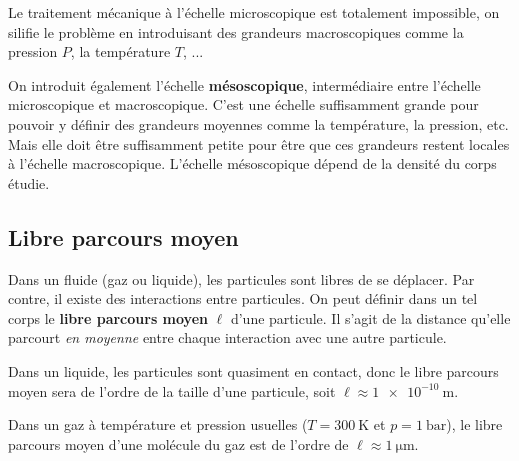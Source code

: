 \documentclass{cours}
\begin{document}
Le traitement mécanique à l'échelle microscopique est totalement impossible, on silifie le problème en introduisant des grandeurs macroscopiques comme la pression $P$, la température $T$, ...  

On introduit également l'échelle \textbf{mésoscopique}, intermédiaire entre l'échelle microscopique et macroscopique. C'est une échelle suffisamment grande pour pouvoir y définir des grandeurs moyennes comme la température, la pression, etc.  Mais elle doit être suffisamment petite pour être que ces grandeurs restent locales à l'échelle macroscopique. L'échelle mésoscopique dépend de la densité du corps étudie.

\subsection{Libre parcours moyen}%
\label{sub:libre_parcours_moyen}
Dans un fluide (gaz ou liquide), les particules sont libres de se déplacer. Par contre, il existe des interactions entre particules. On peut définir dans un tel corps le \textbf{libre parcours moyen} $\ell$  d'une particule. Il s'agit de la distance qu'elle parcourt \textit{en moyenne} entre chaque interaction avec une autre particule. 

Dans un liquide, les particules sont quasiment en contact, donc le libre parcours moyen sera de l'ordre de la taille d'une particule, soit $\ell \approx \SI{1e-10}{\meter}$. 

Dans un gaz à température et pression usuelles ($T=\SI{300}{\kelvin}$ et $p=\SI{1}{\bar}$), le libre parcours moyen d'une molécule du gaz est de l'ordre de $\ell \approx \SI{1}{\micro\m}$. 
\end{document}

